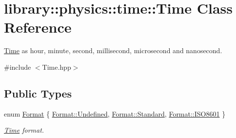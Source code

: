 \hypertarget{classlibrary_1_1physics_1_1time_1_1_time}{}\section{library\+:\+:physics\+:\+:time\+:\+:Time Class Reference}
\label{classlibrary_1_1physics_1_1time_1_1_time}


\hyperlink{classlibrary_1_1physics_1_1time_1_1_time}{Time} as hour, minute, second, millisecond, microsecond and nanosecond.  




{\ttfamily \#include $<$Time.\+hpp$>$}

\subsection*{Public Types}
\begin{DoxyCompactItemize}
\item 
enum \hyperlink{classlibrary_1_1physics_1_1time_1_1_time_a7cfbcbb1d5d0c536e28e61f1e7cbf1c8}{Format} \{ \hyperlink{classlibrary_1_1physics_1_1time_1_1_time_a7cfbcbb1d5d0c536e28e61f1e7cbf1c8aec0fc0100c4fc1ce4eea230c3dc10360}{Format\+::\+Undefined}, 
\hyperlink{classlibrary_1_1physics_1_1time_1_1_time_a7cfbcbb1d5d0c536e28e61f1e7cbf1c8aeb6d8ae6f20283755b339c0dc273988b}{Format\+::\+Standard}, 
\hyperlink{classlibrary_1_1physics_1_1time_1_1_time_a7cfbcbb1d5d0c536e28e61f1e7cbf1c8a35b6786739efcdc5a74ab1dca29d3b6b}{Format\+::\+I\+S\+O8601}
 \}\begin{DoxyCompactList}\small\item\em \hyperlink{classlibrary_1_1physics_1_1time_1_1_time}{Time} format. \end{DoxyCompactList}
\end{DoxyCompactItemize}

